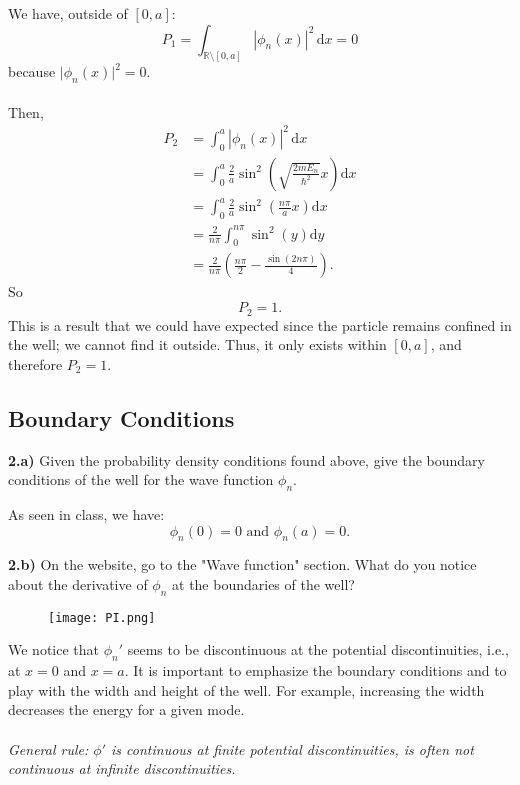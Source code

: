 \begin{breakbox}
    \noindent We have, outside of $[0, a]$:
    $$
    \boxed{P_1 = \int_{\mathbb{R} \setminus [0,a]} |\phi_n(x)|^2 \, \mathrm{d}x = 0}
    $$
    because $\vert \phi_n(x) \vert^2 = 0.$\\ \\
    Then,
    \begin{align*}
    P_2 &= \int_{0}^{a} |\phi_n(x)|^2 \, \mathrm{d}x \\
    &= \int_{0}^{a} \frac{2}{a}\sin^2\left(\sqrt{\frac{2mE_n}{\hbar^2}}x\right) \mathrm{d}x \\
    &= \int_{0}^{a} \frac{2}{a}\sin^2\left(\frac{n\pi}{a}x\right) \mathrm{d}x \\
    &= \frac{2}{n\pi} \int_{0}^{n\pi} \sin^2(y) \mathrm{d}y \\
    &= \frac{2}{n\pi}\left(\frac{n\pi}{2} - \frac{\sin(2n\pi)}{4}\right).
\end{align*}
\noindent So
    \[
        \boxed{P_2 = 1.}
    \]
\noindent This is a result that we could have expected since the particle remains confined in the well; we cannot find it outside. Thus, it only exists within $[0, a]$, and therefore $P_2 = 1$.
\end{breakbox}

\subsection{Boundary Conditions}

\noindent \textbf{2.a)} Given the probability density conditions found above, give the boundary conditions of the well for the wave function $\phi_n$. \\

\begin{breakbox}
    \noindent As seen in class, we have:
    \[
    \boxed{\phi_n(0) = 0 \text{ and } \phi_n(a) = 0.}
    \]
\end{breakbox}

\medskip

\noindent \textbf{2.b)} On the website, go to the "Wave function" section. What do you notice about the derivative of $\phi_n$ at the boundaries of the well? \\

\begin{figure}[H]
    \centering
    \texttt{[image: PI.png]}
    \label{fig:enter-label}
\end{figure}

\begin{breakbox}
\noindent We notice that $\phi_n'$ seems to be discontinuous at the potential discontinuities, i.e., at $x=0$ and $x=a$. It is important to emphasize the boundary conditions and to play with the width and height of the well. For example, increasing the width decreases the energy for a given mode.\\ \\
\textit{General rule: $\phi'$ is continuous at finite potential discontinuities, is often not continuous at infinite discontinuities.}
\end{breakbox}

